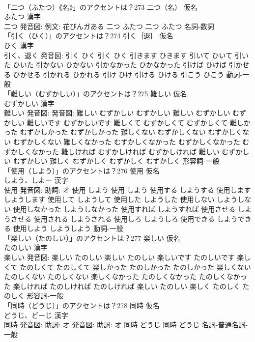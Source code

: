 \documentclass[8pt]{extreport}
\begin{document}
\begin{CJK}{UTF8}{min}
\\	「二つ（ふたつ）《名》」のアクセントは？273	二つ（名） 仮名　
\\	ふたつ 漢字　
\\	二つ 発音図: 例文: 花びんガある	二つ ふたつ		二つ ふたつ				名詞-数詞 
\\	「引く（ひく）」のアクセントは？274	引く｛退｝ 仮名　
\\	ひく 漢字　
\\	引く、退く 発音図:	引く ひく		引く ひく 引きます ひきます 引いて ひいて 引いた ひいた 引かない ひかない 引かなかった ひかなかった 引けば ひけば 引かせる ひかせる 引かれる ひかれる 引け ひけ 引ける ひける 引こう ひこう				動詞-一般 
\\	「難しい（むずかしい）」のアクセントは？275	難しい 仮名　
\\	むずかしい 漢字　
\\	難しい 発音図: 発音図:	難しい むずかしい むずかしい		難しい むずかしい むずかしい 難しいです むずかしいです 難しくて むずかしくて むずかしくて 難しかった むずかしかった むずかしかった 難しくない むずかしくない むずかしくない むずかしくない 難しくなかった むずかしくなかった むずかしくなかった むずかしくなかった 難しければ むずかしければ むずかしければ 難しい むずかしい むずかしい 難しく むずかしく むずかしく むずかしく				形容詞-一般 
\\	「使用（しよう）」のアクセントは？276	使用 仮名　
\\	しよう、しよー 漢字　
\\	使用 発音図: 助詞: オ	使用 しよう		使用 しよう 使用する しようする 使用します しようします 使用して しようして 使用した しようした 使用しない しようしない 使用しなかった しようしなかった 使用すれば しようすれば 使用させる しようさせる 使用される しようされる 使用しろ しようしろ 使用できる しようできる 使用しよう しようしよう				動詞-一般 
\\	「楽しい（たのしい）」のアクセントは？277	楽しい 仮名　
\\	たのしい 漢字　
\\	楽しい 発音図:	楽しい たのしい		楽しい たのしい 楽しいです たのしいです 楽しくて たのしくて たのしくて 楽しかった たのしかった たのしかった 楽しくない たのしくない たのしくない 楽しくなかった たのしくなかった たのしくなかった 楽しければ たのしければ たのしければ 楽しい たのしい 楽しく たのしく たのしく				形容詞-一般 
\\	「同時（どうじ）」のアクセントは？278	同時 仮名　
\\	どうじ、どーじ 漢字　
\\	同時 発音図: 助詞: オ 発音図: 助詞: オ	同時 どうじ		同時 どうじ				名詞-普通名詞-一般 

\end{CJK}
\end{document}
